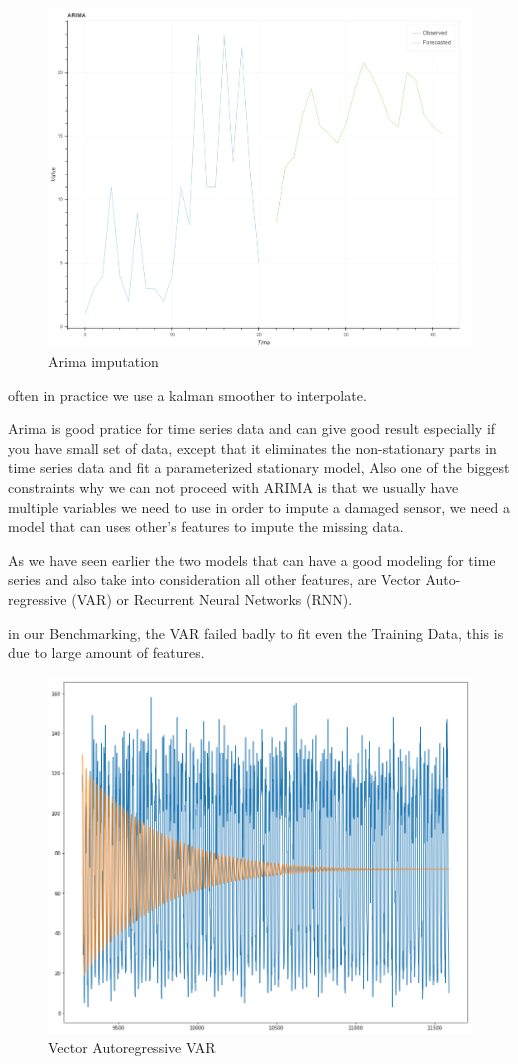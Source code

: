 \begin{figure}[H]
\centering
\includegraphics[scale=.28]{img/arima_imputation.png} 
\caption{Arima imputation}
\label{fig:arima_degree}
\end{figure}
often  in practice we use a kalman smoother to interpolate. 

Arima is good pratice for time series data and can give good result especially if you have small set of data, except that it eliminates the non-stationary parts in time series data and fit a parameterized stationary model, Also one of the biggest constraints why we can not proceed with ARIMA  is that we usually have multiple variables we need to use in order to impute  a damaged sensor, we need a model that can uses other's features to impute the missing data. 

As we have seen earlier the two models that can have a good modeling for time series and also  take into consideration all other features, are  Vector Auto-regressive (VAR) or Recurrent Neural Networks (RNN).

in  our Benchmarking, the VAR failed badly to fit even the Training Data, this is due to large amount of features. 

\begin{figure}[H]
\centering
\includegraphics[width=.5\textwidth]{img/VAR.png} 
\caption{Vector Autoregressive VAR}
\label{fig:arima_degree}
\end{figure}


